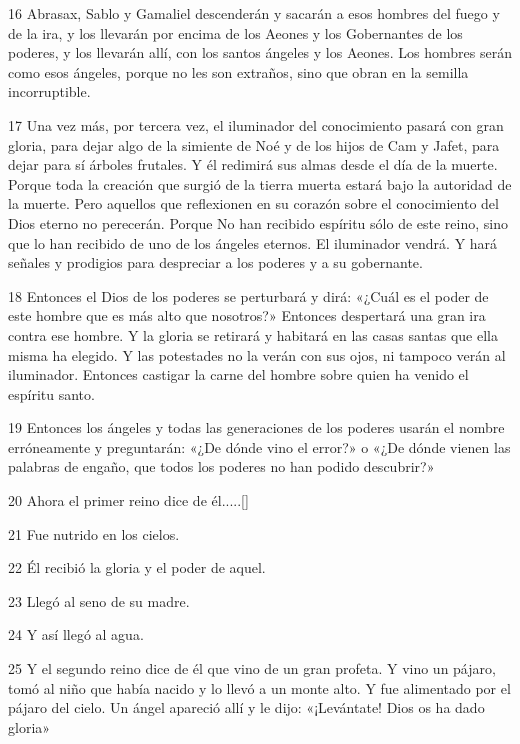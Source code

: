 \par 16 Abrasax, Sablo y Gamaliel descenderán y sacarán a esos hombres del fuego y de la ira, y los llevarán por encima de los Aeones y los Gobernantes de los poderes, y los llevarán allí, con los santos ángeles y los Aeones. Los hombres serán como esos ángeles, porque no les son extraños, sino que obran en la semilla incorruptible.

\par 17 Una vez más, por tercera vez, el iluminador del conocimiento pasará con gran gloria, para dejar algo de la simiente de Noé y de los hijos de Cam y Jafet, para dejar para sí árboles frutales. Y él redimirá sus almas desde el día de la muerte. Porque toda la creación que surgió de la tierra muerta estará bajo la autoridad de la muerte. Pero aquellos que reflexionen en su corazón sobre el conocimiento del Dios eterno no perecerán. Porque No han recibido espíritu sólo de este reino, sino que lo han recibido de uno de los ángeles eternos. El iluminador vendrá. Y hará señales y prodigios para despreciar a los poderes y a su gobernante.

\par 18 Entonces el Dios de los poderes se perturbará y dirá: «¿Cuál es el poder de este hombre que es más alto que nosotros?» Entonces despertará una gran ira contra ese hombre. Y la gloria se retirará y habitará en las casas santas que ella misma ha elegido. Y las potestades no la verán con sus ojos, ni tampoco verán al iluminador. Entonces castigar la carne del hombre sobre quien ha venido el espíritu santo.

\par 19 Entonces los ángeles y todas las generaciones de los poderes usarán el nombre erróneamente y preguntarán: «¿De dónde vino el error?» o «¿De dónde vienen las palabras de engaño, que todos los poderes no han podido descubrir?»

\par 20 Ahora el primer reino dice de él.....[]
\par 21 Fue nutrido en los cielos.
\par 22 Él recibió la gloria y el poder de aquel.
\par 23 Llegó al seno de su madre.
\par 24 Y así llegó al agua.
\par 25 Y el segundo reino dice de él que vino de un gran profeta. Y vino un pájaro, tomó al niño que había nacido y lo llevó a un monte alto. Y fue alimentado por el pájaro del cielo. Un ángel apareció allí y le dijo: «¡Levántate! Dios os ha dado gloria»

